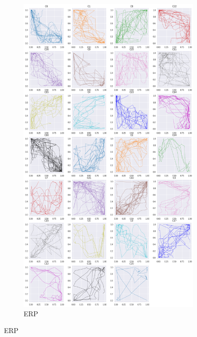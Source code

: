 \begin{figure}[h]
\begin{subfigure}[c]{0.3\linewidth}
     \includegraphics[width=\linewidth]{figs/clusters/CLU_AP_ALL[ERP;g=0,0].png}
    \caption{ERP}
  \end{subfigure}
  \hspace{.5em}
  

\end{figure}
